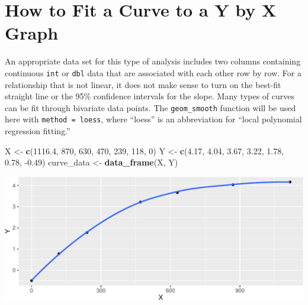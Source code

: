 \documentclass[twoside, 12pt]{article}
\newenvironment{Shaded}{\begin{snugshade}}{\end{snugshade}}
\newcommand{\KeywordTok}[1]{\textcolor[rgb]{0.13,0.29,0.53}{\textbf{{#1}}}}
\newcommand{\DataTypeTok}[1]{\textcolor[rgb]{0.13,0.29,0.53}{{#1}}}
\newcommand{\DecValTok}[1]{\textcolor[rgb]{0.00,0.00,0.81}{{#1}}}
\newcommand{\FloatTok}[1]{\textcolor[rgb]{0.00,0.00,0.81}{{#1}}}
\newcommand{\StringTok}[1]{\textcolor[rgb]{0.31,0.60,0.02}{{#1}}}
\newcommand{\OtherTok}[1]{\textcolor[rgb]{0.56,0.35,0.01}{{#1}}}
\newcommand{\NormalTok}[1]{{#1}}
\begin{document}
\section{How to Fit a Curve to a Y by X
Graph}\label{how-to-fit-a-curve-to-a-y-by-x-graph}

An appropriate data set for this type of analysis includes two columns
containing continuous \texttt{int} or \texttt{dbl} data that are
associated with each other row by row. For a relationship that is not
linear, it does not make sense to turn on the best-fit straight line or
the 95\% confidence intervals for the slope. Many types of curves can be
fit through bivariate data points. The \texttt{geom\_smooth} function
will be used here with \texttt{method\ =\ loess}, where ``loess'' is an
abbreviation for ``local polynomial regression fitting.''

\begin{Shaded}
\begin{Highlighting}[]
\NormalTok{X <-}\StringTok{ }\KeywordTok{c}\NormalTok{(}\FloatTok{1116.4}\NormalTok{, }\DecValTok{870}\NormalTok{, }\DecValTok{630}\NormalTok{, }\DecValTok{470}\NormalTok{, }\DecValTok{239}\NormalTok{, }\DecValTok{118}\NormalTok{, }\DecValTok{0}\NormalTok{)}
\NormalTok{Y <-}\StringTok{ }\KeywordTok{c}\NormalTok{(}\FloatTok{4.17}\NormalTok{, }\FloatTok{4.04}\NormalTok{, }\FloatTok{3.67}\NormalTok{, }\FloatTok{3.22}\NormalTok{, }\FloatTok{1.78}\NormalTok{, }\FloatTok{0.78}\NormalTok{, -}\FloatTok{0.49}\NormalTok{)}
\NormalTok{curve_data <-}\StringTok{ }\KeywordTok{data_frame}\NormalTok{(X, Y)}
\end{Highlighting}
\end{Shaded}

\begin{Shaded}
\end{Shaded}

\includegraphics{skeleton_files/figure-latex/unnamed-chunk-50-1.pdf}
\end{document}
